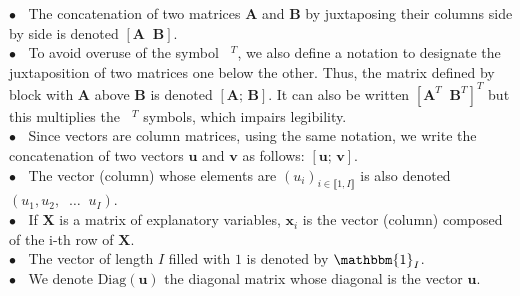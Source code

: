 \documentclass[10pt]{article}
\begin{document}
\noindent $\bullet \; \;$ The concatenation of two matrices $\mathbf{A}$ and $\mathbf{B}$ by juxtaposing their columns side by side is denoted $[\mathbf{A} \; \; \mathbf{B}]$.\\
$\bullet \; \;$ To avoid overuse of the symbol $\phantom{a}^T$, we also define a notation to designate the juxtaposition of two matrices one below the other. Thus, the matrix defined by block with $\mathbf{A}$ above $\mathbf{B}$ is denoted $\left[\mathbf{A}; \, \mathbf{B}\right]$. It can also be written $[\mathbf{A}^T \; \; \mathbf{B}^T]^T$ but this multiplies the $\phantom{a}^T$ symbols, which impairs legibility. \\
$\bullet \; \;$ Since vectors are column matrices, using the same notation, we write the concatenation of two vectors $\mathbf{u}$ and $\mathbf{v}$ as follows: $[\mathbf{u}; \, \mathbf{v}]$.  \\
$\bullet \; \;$ The vector (column) whose elements are $(u_i)_{i \in \llbracket 1, I\rrbracket}$ is also denoted $(u_1, u_2, \; \; \hdots \;\; u_I)$. \\
$\bullet \; \;$ If $\mathbf{X}$ is a matrix of explanatory variables, $\mathbf{x}_i$ is the vector (column) composed of the i-th row of $\mathbf{X}$.\\
$\bullet \; \;$ The vector of length $I$ filled with $1$ is denoted by $\mathbbm{1}_I$.\\
$\bullet \; \;$ We denote $\text{Diag}(\mathbf{u})$ the diagonal matrix whose diagonal is the vector $\mathbf{u}$. \\

\end{document}
